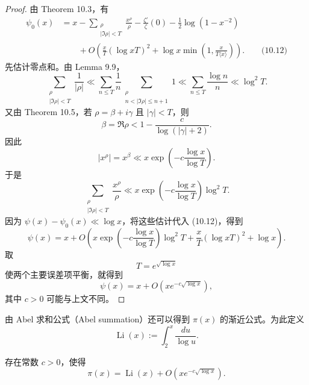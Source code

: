 \begin{proof}
	由 Theorem 10.3，有
	\begin{equation*}
	\begin{aligned}
		\psi_0(x)
		&=
		x
		-
		\sum_{\substack{\rho\\ |\Im\rho|<T}}\frac{x^\rho}{\rho}
		-
		\frac{\zeta'}{\zeta}(0)
		-
		\frac12\log(1-x^{-2}) \\
		&\qquad+
		O\left(
			\frac{x}{T}(\log xT)^2
			+
			\log x\min\left(1,\frac{x}{T\langle x\rangle}\right)
		\right).
		\qquad\text{(10.12)}
	\end{aligned}
	\end{equation*}
	先估计零点和。由 Lemma 9.9，
	\[
		\sum_{\substack{\rho\\ |\Im\rho|<T}}\frac1{|\rho|}
		\ll
		\sum_{n\leq T}
		\frac1n
		\sum_{\substack{\rho\\ n<|\Im\rho|\leq n+1}}1
		\ll
		\sum_{n\leq T}\frac{\log n}{n}
		\ll
		\log^2 T.
	\]
	又由 Theorem 10.5，若 $\rho=\beta+i\gamma$ 且 $|\gamma|<T$，则
	\[
		\beta
		=
		\Re\rho
		<
		1-\frac{c}{\log(|\gamma|+2)}.
	\]
	因此
	\[
		|x^\rho|
		=
		x^\beta
		\ll
		x\exp\left(-c\frac{\log x}{\log T}\right).
	\]
	于是
	\[
		\sum_{\substack{\rho\\ |\Im\rho|<T}}
		\frac{x^\rho}{\rho}
		\ll
		x\exp\left(-c\frac{\log x}{\log T}\right)\log^2T.
	\]
	因为 $\psi(x)-\psi_0(x)\ll\log x$，将这些估计代入 (10.12)，得到
	\[
		\psi(x)
		=
		x
		+
		O\left(
			x\exp\left(-c\frac{\log x}{\log T}\right)\log^2T
			+
			\frac{x}{T}(\log xT)^2
			+
			\log x
		\right).
	\]
	取
	\[
		T=e^{\sqrt{\log x}}
	\]
	使两个主要误差项平衡，就得到
	\[
		\psi(x)
		=
		x+O\left(xe^{-c\sqrt{\log x}}\right),
	\]
	其中 $c>0$ 可能与上文不同。
\end{proof}

由 Abel 求和公式（Abel summation）还可以得到 $\pi(x)$ 的渐近公式。为此定义
\[
	\operatorname{Li}(x)
	:=
	\int_2^x\frac{du}{\log u}.
\]

\begin{theorem}[原文 Theorem 10.7]
	存在常数 $c>0$，使得
	\[
		\pi(x)
		=
		\operatorname{Li}(x)
		+
		O\left(xe^{-c\sqrt{\log x}}\right).
	\]
\end{theorem}

